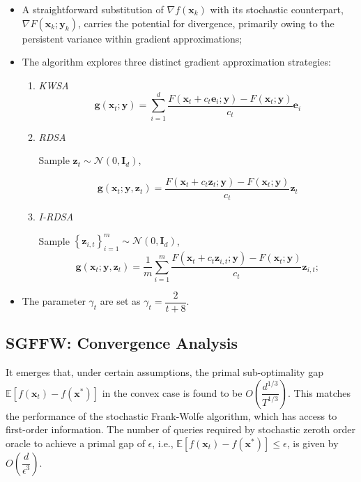 \begin{multicols}{2}
\begin{itemize}[left=0pt,labelindent=0pt]
    \item A straightforward substitution of $\nabla f(\mathbf{x}_k)$ with 
    its stochastic counterpart, $\nabla F(\mathbf{x}_k ; \mathbf{y}_k)$, 
    carries the potential for divergence, primarily owing to the persistent 
    variance within gradient approximations;
    
    \item The algorithm explores three distinct gradient approximation strategies:
    
    \begin{enumerate}[left=0pt,labelindent=0pt]
        \item \textit{KWSA}
        \small{
        $$
        \mathbf{g}\left(\mathbf{x}_t ; \mathbf{y}\right)=\sum_{i=1}^d \frac{F\left(\mathbf{x}_t+c_t \mathbf{e}_i ; \mathbf{y}\right)-F\left(\mathbf{x}_t ; \mathbf{y}\right)}{c_t} \mathbf{e}_i
        $$
        }
        \item \textit{RDSA}

        Sample $\mathbf{z}_t \sim \mathcal{N}\left(0, \mathbf{I}_d\right)$,
        
        \small{
        $$
        \mathbf{g}\left(\mathbf{x}_t ; \mathbf{y}, \mathbf{z}_t\right)=\frac{F\left(\mathbf{x}_t+c_t \mathbf{z}_t ; \mathbf{y}\right)-F\left(\mathbf{x}_t ; \mathbf{y}\right)}{c_t} \mathbf{z}_t
        $$
        }

        \item \textit{I-RDSA}
        
        Sample $\left\{\mathbf{z}_{i, t}\right\}_{i=1}^m \sim \mathcal{N}\left(0, \mathbf{I}_d\right)$,
        \small{
        $$
        \mathbf{g}\left(\mathbf{x}_t ; \mathbf{y}, \mathbf{z}_t\right)=\frac{1}{m} \sum_{i=1}^m \frac{F\left(\mathbf{x}_t+c_t \mathbf{z}_{i, t} ; \mathbf{y}\right)-F\left(\mathbf{x}_t ; \mathbf{y}\right)}{c_t} \mathbf{z}_{i, t};
        $$
        }
    \end{enumerate}
    
    \item The parameter  $\gamma_t$ are set as $\gamma_t=\dfrac{2}{t+8}$.
\end{itemize}


\subsection{SGFFW: Convergence Analysis}

It emerges that, under certain assumptions, the primal sub-optimality gap 
$\mathbb{E}\left[f\left(\mathbf{x}_t\right)-f\left(\mathbf{x}^*\right)\right]$ 
in the convex case is found to be $O(\dfrac{d^{1/3}}{T^{1/3}})$. 
This matches the performance of the stochastic Frank-Wolfe algorithm, 
which has access to first-order information. The number of queries required by 
stochastic zeroth order oracle to achieve a primal gap of $\epsilon$, i.e., 
$\mathbb{E}\left[f\left(\mathbf{x}_t\right)-f\left(\mathbf{x}^*\right)\right] \leq \epsilon$, 
is given by $O\left(\dfrac{d}{\epsilon^3}\right)$. 


\end{multicols}
